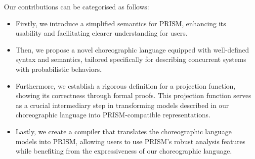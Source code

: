  Our contributions can be categorised as follows: 
\begin{itemize}
\item Firstly, we introduce a simplified semantics for PRISM, enhancing its usability and facilitating clearer understanding for users. 
\item Then, we propose a novel choreographic language equipped with well-defined syntax and semantics, tailored specifically for describing concurrent systems with probabilistic behaviors. 
\item Furthermore, we establish a rigorous definition for a projection function, showing its correctness through formal proofs. This projection function serves as a crucial intermediary step in transforming models described in our choreographic language into PRISM-compatible representations. 
\item Lastly, we create a compiler that translates the choreographic language models into PRISM, allowing users to use PRISM's robust analysis features while benefiting from the expressiveness of our choreographic language.
\end{itemize}




